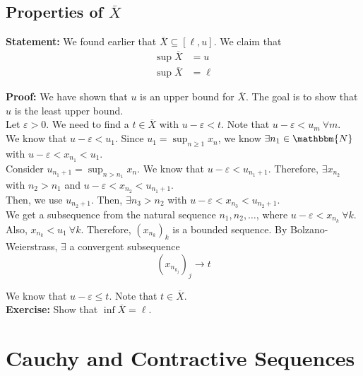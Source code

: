 \documentclass[10pt]{extarticle}
\newcommand{\N}{\mathbbm{N}}
\begin{document}
  \subsection{Properties of $\overline{X}$}%
  \textbf{Statement:} We found earlier that $\overline{X} \subseteq [\ell,u]$. We claim that
    \begin{align*}
      \sup \overline{X} &= u\\
      \sup\overline{X} &= \ell
    \end{align*}

    \textbf{Proof:} We have shown that $u$ is an upper bound for $\overline{X}$. The goal is to show that $u$ is the least upper bound.\\

    Let $\varepsilon > 0$. We need to find a $t\in\overline{X}$ with $u-\varepsilon < t$. Note that $u-\varepsilon < u_m~\forall m$.\\

    We know that $u-\varepsilon < u_1$. Since $u_1 = \sup_{n\geq 1}x_n$, we know $\exists n_1\in\N$ with $u-\varepsilon < x_{n_1} < u_1$.\\

    Consider $u_{n_1+1} = \sup_{n > n_1}x_n$. We know that $u-\varepsilon < u_{n_1 + 1}$. Therefore, $\exists x_{n_2}$ with $n_2 > n_1$ and $u-\varepsilon < x_{n_2} < u_{n_1 + 1}$.\\

    Then, we use $u_{n_2 + 1}$. Then, $\exists n_3 > n_2$ with $u-\varepsilon < x_{n_3} < u_{n_2 + 1}$.\\

    We get a subsequence from the natural sequence $n_1,n_2,\dots$, where $u - \varepsilon < x_{n_k}~\forall k$.\\

    Also, $x_{n_k} < u_1~\forall k$. Therefore, $(x_{n_k})_k$ is a bounded sequence. By Bolzano-Weierstrass, $\exists$ a convergent subsequence \[\left(x_{n_{k_j}}\right)_j \rightarrow t\]

    We know that $u-\varepsilon \leq t$. Note that $t\in\overline{X}$.\\

    \textbf{Exercise:} Show that $\inf\overline{X} = \ell$.
  \section{Cauchy and Contractive Sequences}%
\end{document}
